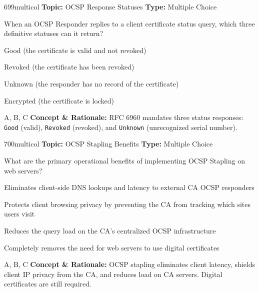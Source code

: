 \begin{qcard}{699}{multicol}
\textcolor{darkslate!75}{\small\textbf{Topic:} OCSP Response Statuses \hfill \textbf{Type:} Multiple Choice}\vspace{0.4em}\par
When an OCSP Responder replies to a client certificate status query, which three definitive statuses can it return?
\begin{qoptions}
\item Good (the certificate is valid and not revoked)
\item Revoked (the certificate has been revoked)
\item Unknown (the responder has no record of the certificate)
\item Encrypted (the certificate is locked)
\end{qoptions}
\end{qcard}
\nopagebreak
\begin{explainbox}{A, B, C}
\textbf{Concept \& Rationale:} RFC 6960 mandates three status responses: \texttt{Good} (valid), \texttt{Revoked} (revoked), and \texttt{Unknown} (unrecognized serial number).
\end{explainbox}

\begin{qcard}{700}{multicol}
\textcolor{darkslate!75}{\small\textbf{Topic:} OCSP Stapling Benefits \hfill \textbf{Type:} Multiple Choice}\vspace{0.4em}\par
What are the primary operational benefits of implementing OCSP Stapling on web servers?
\begin{qoptions}
\item Eliminates client-side DNS lookups and latency to external CA OCSP responders
\item Protects client browsing privacy by preventing the CA from tracking which sites users visit
\item Reduces the query load on the CA's centralized OCSP infrastructure
\item Completely removes the need for web servers to use digital certificates
\end{qoptions}
\end{qcard}
\nopagebreak
\begin{explainbox}{A, B, C}
\textbf{Concept \& Rationale:} OCSP stapling eliminates client latency, shields client IP privacy from the CA, and reduces load on CA servers. Digital certificates are still required.
\end{explainbox}

